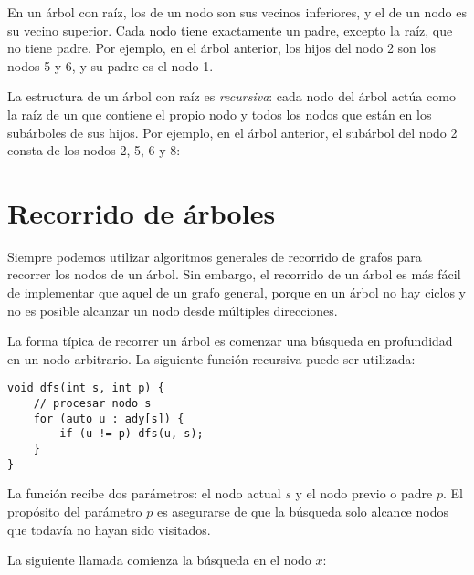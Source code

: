 En un árbol con raíz, los  de un nodo
son sus vecinos inferiores, y el  de un nodo
es su vecino superior.
Cada nodo tiene exactamente un padre,
excepto la raíz, que no tiene padre.
Por ejemplo, en el árbol anterior,
los hijos del nodo 2 son los nodos 5 y 6,
y su padre es el nodo 1.


La estructura de un árbol con raíz es \emph{recursiva}:
cada nodo del árbol actúa como la raíz de un 
que contiene el propio nodo y todos los nodos
que están en los subárboles de sus hijos.
Por ejemplo, en el árbol anterior, el subárbol del nodo 2
consta de los nodos 2, 5, 6 y 8:
\begin{center}
\end{center}

\section{Recorrido de árboles}

Siempre podemos utilizar algoritmos generales de recorrido de grafos
para recorrer los nodos de un árbol. Sin embargo, el recorrido
de un árbol es más fácil de implementar que aquel de un grafo general,
porque en un árbol no hay ciclos y no es posible alcanzar un nodo
desde múltiples direcciones.

La forma típica de recorrer un árbol es comenzar una búsqueda en
profundidad en un nodo arbitrario. La siguiente función recursiva
puede ser utilizada:

\begin{lstlisting}
void dfs(int s, int p) {
    // procesar nodo s
    for (auto u : ady[s]) {
        if (u != p) dfs(u, s);
    }
}
\end{lstlisting}

La función recibe dos parámetros: el nodo actual $s$ y el nodo
previo o padre $p$. El propósito del parámetro $p$ es asegurarse de que
la búsqueda solo alcance nodos que todavía no hayan sido visitados.

La siguiente llamada comienza la búsqueda en el nodo $x$:

